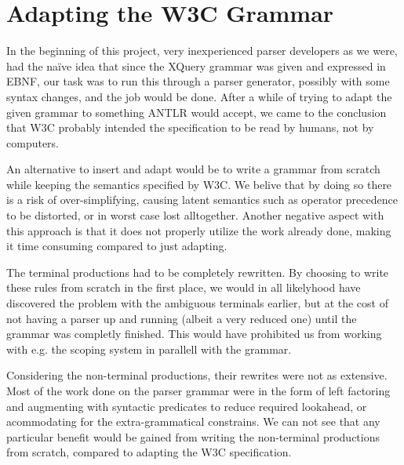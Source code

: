 \section{Adapting the W3C Grammar}
\label{sect:discussion:adaptW3C}

In the beginning of this project, very inexperienced parser developers as we
were, had the na\"{i}ve idea that since the XQuery grammar was given and
expressed in EBNF, our task was to run this through a parser generator,
possibly with some syntax changes, and the job would be done. After a while of
trying to adapt the given grammar to something ANTLR would accept, we came to
the conclusion that W3C probably intended the specification to be read by
humans, not by computers. 

An alternative to insert and adapt would be to write a grammar from scratch
while keeping the semantics specified by W3C. We belive that by doing so there
is a risk of over-simplifying, causing latent semantics such as operator
precedence to be distorted, or in worst case lost alltogether. Another negative
aspect with this approach is that it does not properly utilize the work already
done, making it time consuming compared to just adapting.

The terminal productions had to be completely rewritten. By choosing to write
these rules from scratch in the first place, we would in all likelyhood have
discovered the problem with the ambiguous terminals earlier, but at the cost of
not having a parser up and running (albeit a very reduced one) until the
grammar was completly finished. This would have prohibited us from working with
e.g. the scoping system in parallell with the grammar.

Considering the non-terminal productions, their rewrites were not as extensive.
Most of the work done on the parser grammar were in the form of left factoring
and augmenting with syntactic predicates to reduce required lookahead, or
acommodating for the extra-grammatical constrains. We can not see that any
particular benefit would be gained from writing the non-terminal productions
from scratch, compared to adapting the W3C specification.
